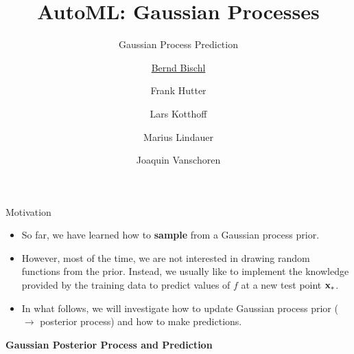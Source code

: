 



\newcommand{\lz}{\vspace{0.5cm}}
\newcommand{\thetab}{\bm{\weights}}
\newcommand{\zero}{\mathbf{0}}
\newcommand{\Xmat}{\mathbf{X}}
\newcommand{\ydat}{\mathbf{y}}
\newcommand{\id}{\boldsymbol{I}}
\newcommand{\Amat}{\mathbf{A}}
\newcommand{\Xspace}{\mathcal{X}}                                           
\newcommand{\Yspace}{\mathcal{Y}}
\newcommand{\ls}{\ell}
\newcommand{\natnum}{\mathbb{N}}
\newcommand{\intnum}{\mathbb{Z}}
\newcommand{\Kmat}{\bm{K}}


\usepackage{fontawesome}
\usepackage{dirtytalk}
\usepackage{csquotes}

\def\argmin{\mathop{\sf arg\,min}}   






\title[AutoML: GPs]{AutoML: Gaussian Processes} %
\subtitle{Gaussian Process Prediction} %
\author[Marius Lindauer]{\underline{Bernd Bischl} \and Frank Hutter \and Lars Kotthoff\newline \and Marius Lindauer \and Joaquin Vanschoren}
\institute{}
\date{}





\maketitle



\begin{frame}[c]{Motivation}

\begin{itemize}

\item So far, we have learned how to \textbf{sample} from a Gaussian process prior.
\lz
\item However, most of the time, we are not interested in drawing random functions from the prior. Instead, we usually like to implement the knowledge provided by the training data to predict values of $f$ at a new test point $\mathbf{x}_*$. 
\lz
\item In what follows, we will investigate how to update Gaussian process prior ($\to$ posterior process) and how to make predictions.


\end{itemize}


\end{frame}
\begin{frame}[c]{}
\centering
\huge
\textbf{Gaussian Posterior Process and Prediction}
\end{frame}


